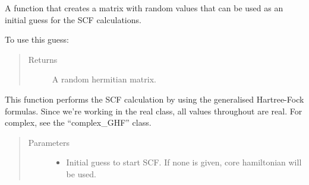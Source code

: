 \documentclass[letterpaper,10pt,english]{sphinxmanual}
\begin{document}
\begin{fulllineitems}
\begin{fulllineitems}
\label{\detokenize{GHF:hf.HartreeFock.GHF.MF.random_guess}}
A function that creates a matrix with random values that can be used as an initial guess
for the SCF calculations.

To use this guess:

\begin{sphinxVerbatim}[commandchars=\\\{\}]
   
          
   
  
\end{sphinxVerbatim}
\begin{quote}\begin{description}
\item[{Returns}] \leavevmode
A random hermitian matrix.

\end{description}\end{quote}

\end{fulllineitems}


\begin{fulllineitems}
\label{\detokenize{GHF:hf.HartreeFock.GHF.MF.scf}}
This function performs the SCF calculation by using the generalised Hartree-Fock formulas. Since we’re working
in the real class, all values throughout are real. For complex, see the “complex\_GHF” class.
\begin{quote}\begin{description}
\item[{Parameters}] \leavevmode\begin{itemize}
\item {} 
 \textendash{} Initial guess to start SCF. If none is given, core hamiltonian will be used.


\end{itemize}
\end{description}
\end{quote}
\end{fulllineitems}
\end{fulllineitems}
\end{document}
